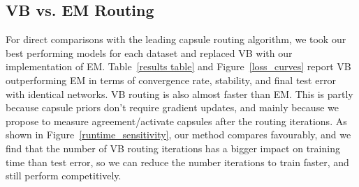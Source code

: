 \documentclass[letterpaper]{article} \usepackage{aaai20}  \usepackage{times}  \usepackage{helvet} \usepackage{courier}  \usepackage[hyphens]{url}  \usepackage{graphicx} \urlstyle{rm} \def\UrlFont{\rm}  \usepackage{graphicx}  \frenchspacing  \setlength{\pdfpagewidth}{8.5in}  \setlength{\pdfpageheight}{11in}  \nocopyright
\begin{document}
\subsection{VB vs. EM Routing}
For direct comparisons with the leading capsule routing algorithm, we took our best performing models for each dataset and replaced VB with our implementation of EM. Table~\ref{results table} and Figure~\ref{loss_curves} report VB outperforming EM in terms of convergence rate, stability, and final test error with identical networks. VB routing is also almost  faster than EM. This is partly because capsule priors don't require gradient updates, and mainly because we propose to measure agreement/activate capsules after the routing iterations. As shown in Figure~\ref{runtime_sensitivity}, our method compares favourably, and we find that the number of VB routing iterations has a bigger impact on training time than test error, so we can reduce the number iterations to train faster, and still perform competitively.
\end{document}
